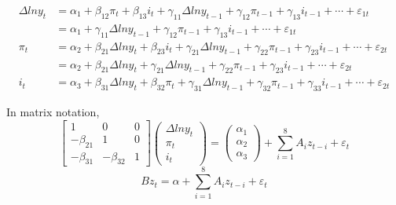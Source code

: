 \documentclass{article}
\begin{document}
    $$
    \begin{aligned}
    \Delta lny_{t} &= \alpha_{1}+\beta_{12} \pi_{t}+ \beta_{13} i_{t} + \gamma_{11} \Delta lny_{t-1} + \gamma_{12} \pi_{t-1} + \gamma_{13} i_{t-1} + \cdots +  \varepsilon_{1 t}\\ 
        &= \alpha_{1} + \gamma_{11} \Delta lny_{t-1} + \gamma_{12} \pi_{t-1} + \gamma_{13} i_{t-1} + \cdots +  \varepsilon_{1 t}\\
    \pi_{t} &= \alpha_{2} + \beta_{21} \Delta lny_{t} + \beta_{23} i_{t} + \gamma_{21} \Delta lny_{t-1} + \gamma_{22} \pi_{t-1} + \gamma_{23} i_{t-1} + \cdots + \varepsilon_{2 t}\\
        &= \alpha_{2} + \beta_{21} \Delta lny_{t} + \gamma_{21} \Delta lny_{t-1} + \gamma_{22} \pi_{t-1} + \gamma_{23} i_{t-1} + \cdots + \varepsilon_{2 t}\\
    i_{t} &= \alpha_{3} + \beta_{31} \Delta lny_{t} + \beta_{32} \pi_{t} + \gamma_{31} \Delta lny_{t-1} + \gamma_{32} \pi_{t-1} + \gamma_{33} i_{t-1} + \cdots +\varepsilon_{2 t}
    \end{aligned}
    $$ 
    
    In matrix notation,
    $$
    \left[\begin{array}{lll} 1 & 0 & 0 \\ -\beta_{21} & 1 & 0 \\ -\beta_{31} & -\beta_{32} & 1\end{array}\right] \left(\begin{array}{l} \Delta lny_{t} \\ \pi_{t} \\ i_{t} \end{array}\right) =  \left(\begin{array}{l}\alpha_{1} \\ \alpha_{2} \\\alpha_{3} \end{array}\right) + \sum_{i=1}^{8} A_{i} z_{t-i} + \varepsilon_{t}
    $$        
    $$
    Bz_{t} = \alpha + \sum_{i=1}^{8} A_{i} z_{t-i} + \varepsilon_{t}
    $$
\end{document}
